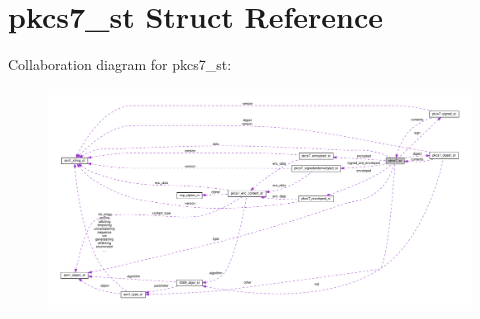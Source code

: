 \hypertarget{structpkcs7__st}{}\section{pkcs7\+\_\+st Struct Reference}
\label{structpkcs7__st}


Collaboration diagram for pkcs7\+\_\+st\+:
\nopagebreak
\begin{figure}[H]
\begin{center}
\leavevmode
\includegraphics[width=350pt]{structpkcs7__st__coll__graph}
\end{center}
\end{figure}

